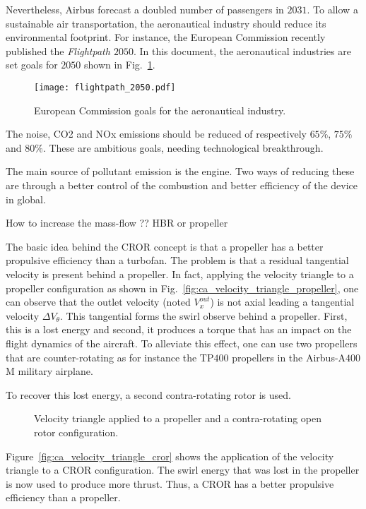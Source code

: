 Nevertheless, Airbus forecast a doubled number of passengers in
$2031$. To allow a sustainable air transportation, the aeronautical
industry should reduce its environmental footprint. For instance,
the European Commission recently published the \emph{Flightpath $2050$}.
In this document, the aeronautical industries are set goals for $2050$
shown in Fig.~\ref{fig:flightpath_2050}.
\begin{figure}[htbp]
  \centering
  \texttt{[image: flightpath\_2050.pdf]}
  \caption{European Commission goals for the aeronautical industry. }
  \label{fig:flightpath_2050}
\end{figure}
The noise, CO2 and NOx emissions should be reduced of 
respectively $65\%$, $75\%$ and $80\%$.
These are ambitious goals, needing technological breakthrough.

The main source of pollutant emission is the engine. Two ways of reducing
these are through a better control of the combustion and better
efficiency of the device in global.

How to increase the mass-flow ??
HBR or propeller

The basic idea behind the CROR concept is that a propeller has a 
better propulsive efficiency than a turbofan. The problem is that
a residual tangential velocity is present behind a propeller.
In fact, applying the velocity triangle to a propeller configuration
as shown in Fig.~\ref{fig:ca_velocity_triangle_propeller}, one can
observe that the outlet velocity (noted $V^{out}_x$) is not axial
leading a tangential velocity $\Delta V_{\theta}$. This tangential forms
the swirl observe behind a propeller. First, this is a lost energy and
second, it produces a torque that has an impact on the flight dynamics
of the aircraft. To alleviate this effect, one can use two propellers
that are counter-rotating as for instance the TP$400$ propellers
in the Airbus-A$400$M military airplane.

To recover this lost energy, a second contra-rotating rotor is used.
\begin{figure}[htb]
  \centering
  \caption{Velocity triangle applied to a propeller and a 
  contra-rotating open rotor configuration.}
\end{figure}
Figure~\ref{fig:ca_velocity_triangle_cror} shows the application
of the velocity triangle to a CROR configuration. The swirl
energy that was lost in the propeller is now used to 
produce more thrust. Thus, a CROR has a better propulsive
efficiency than a propeller.

